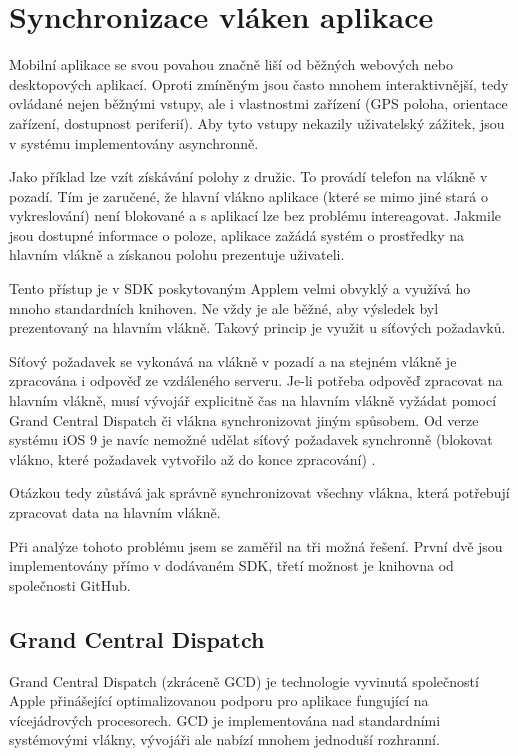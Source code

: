\section{Synchronizace vláken aplikace} \label{analyza-synchronizace-vlaken}

Mobilní aplikace se svou povahou značně liší od běžných webových nebo desktopových aplikací.
Oproti zmíněným jsou často mnohem interaktivnější, tedy ovládané nejen běžnými vstupy, ale i vlastnostmi zařízení (GPS poloha, orientace zařízení, dostupnost periferií).
Aby tyto vstupy nekazily uživatelský zážitek, jsou v systému implementovány asynchronně.

Jako příklad lze vzít získávání polohy z družic.
To provádí telefon na vlákně v pozadí.
Tím je zaručené, že hlavní vlákno aplikace (které se mimo jiné stará o vykreslování) není blokované a s aplikací lze bez problému intereagovat.
Jakmile jsou dostupné informace o poloze, aplikace zažádá systém o prostředky na hlavním vlákně a získanou polohu prezentuje uživateli.

Tento přístup je v SDK poskytovaným Applem velmi obvyklý a využívá ho mnoho standardních knihoven.
Ne vždy je ale běžné, aby výsledek byl prezentovaný na hlavním vlákně.
Takový princip je využit u síťových požadavků.

Síťový požadavek se vykonává na vlákně v pozadí a na stejném vlákně je zpracována i odpověď ze vzdáleného serveru.
Je-li potřeba odpověď zpracovat na hlavním vlákně, musí vývojář explicitně čas na hlavním vlákně vyžádat pomocí Grand Central Dispatch či vlákna synchronizovat jiným spůsobem.
Od verze systému iOS 9 je navíc nemožné udělat síťový požadavek synchronně (blokovat vlákno, které požadavek vytvořilo až do konce zpracování) \cite{apple-whats-new-in-ios}.

Otázkou tedy zůstává jak správně synchronizovat všechny vlákna, která potřebují zpracovat data na hlavním vlákně.

Při analýze tohoto problému jsem se zaměřil na tři možná řešení.
První dvě jsou implementovány přímo v dodávaném SDK, třetí možnost je knihovna od společnosti GitHub.

\subsection{Grand Central Dispatch}

Grand Central Dispatch (zkráceně GCD) je technologie vyvinutá společností Apple přinášející optimalizovanou podporu pro aplikace fungující na vícejádrových procesorech.
GCD je implementována nad standardními systémovými vlákny, vývojáři ale nabízí mnohem jednoduší rozhranní.

